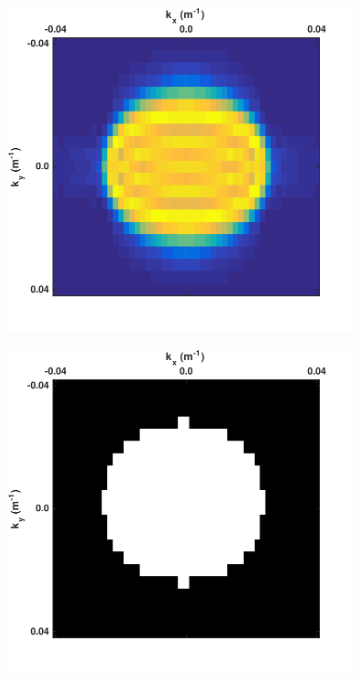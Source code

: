 
\begin{figure}
	\centering
	\begin{subfigure}[t]{0.3\textwidth}
		\centering
		\includegraphics[width=\textwidth]{Plots/IdealData3d/P_f_slice40}
		\caption{}
		\label{fig:Ch-Theory-FK-f_slice-data}
	\end{subfigure}
	\centering
	\begin{subfigure}[t]{0.3\textwidth}
		\centering
		\includegraphics[width=\textwidth]{Plots/IdealData3d/fkk-mask-slice40}

\end{subfigure}
\end{figure}
